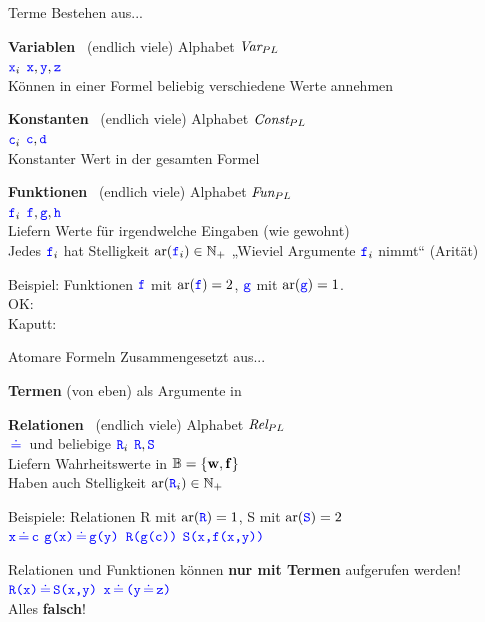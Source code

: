 \begin{frame}{Terme}
	Bestehen aus... \\
	\medskip
	
	\textbf{Variablen} \, (endlich viele) \quad Alphabet $\text{\itshape Var}_{PL}$ \\
	$\hbox{\textcolor{blue}{\texttt{x}}}_i$ \quad $\hbox{\textcolor{blue}{\texttt{x}}}, \hbox{\textcolor{blue}{\texttt{y}}}, \hbox{\textcolor{blue}{\texttt{z}}}$ \\
	Können in einer Formel beliebig verschiedene Werte annehmen \\
	\medskip \pause
	
	\textbf{Konstanten} \, (endlich viele) \quad Alphabet $\text{\itshape Const}_{PL}$ \\
	$\hbox{\textcolor{blue}{\texttt{c}}}_i$ \quad $\hbox{\textcolor{blue}{\texttt{c}}}, \hbox{\textcolor{blue}{\texttt{d}}}$ \\
	Konstanter Wert in der gesamten Formel \\
	\medskip \pause
	
	\textbf{Funktionen} \, (endlich viele) \quad Alphabet $\text{\itshape Fun}_{PL}$ \\
	$\hbox{\textcolor{blue}{\texttt{f}}}_i$ \quad $\hbox{\textcolor{blue}{\texttt{f}}}, \hbox{\textcolor{blue}{\texttt{g}}}, \hbox{\textcolor{blue}{\texttt{h}}}$ \\
	Liefern Werte für irgendwelche Eingaben (wie gewohnt) \\
	Jedes $\hbox{\textcolor{blue}{\texttt{f}}}_i$ hat Stelligkeit $\mathrm{ar}(\hbox{\textcolor{blue}{\texttt{f}}}_i) \in \mathbb{N}_+$ \quad „Wieviel Argumente $\hbox{\textcolor{blue}{\texttt{f}}}_i$ nimmt“ {\small (Arität)} \\
	\smallskip \pause
	
	Beispiel: 
	\quad Funktionen $\hbox{\textcolor{blue}{\texttt{f}}}$ mit $\mathrm{ar}(\hbox{\textcolor{blue}{\texttt{f}}}) = 2$, \quad $\hbox{\textcolor{blue}{\texttt{g}}}$ mit $\mathrm{ar}(\hbox{\textcolor{blue}{\texttt{g}}}) = 1$. \\ \pause
	\quad OK: \qquad {} \qquad {} \qquad {} \\
	\quad Kaputt: \qquad {} \qquad {} \qquad {} \qquad {}
\end{frame}

\begin{frame}{Atomare Formeln}
	Zusammengesetzt aus... \\
	\medskip
	
	\textbf{Termen} (von eben) als Argumente in \\
	\medskip
	
	\textbf{Relationen} \, (endlich viele) \quad Alphabet $\text{\itshape Rel}_{PL}$  \\
	$\pleq$ und beliebige $\hbox{\textcolor{blue}{\texttt{R}}}_i$ \quad $\hbox{\textcolor{blue}{\texttt{R}}}, \hbox{\textcolor{blue}{\texttt{S}}}$ \\
	Liefern Wahrheitswerte in $\mathbb{B} = \left\{\hbox{\textbf{w}}, \hbox{\textbf{f}}\right\}$ \\
	Haben auch Stelligkeit $\mathrm{ar}(\hbox{\textcolor{blue}{\texttt{R}}}_i) \in \mathbb{N}_+$ \\
	\medskip \pause
	
	Beispiele: \quad Relationen \word R mit $\mathrm{ar}(\hbox{\textcolor{blue}{\texttt{R}}}) = 1$, \quad \word S mit $\mathrm{ar}(\hbox{\textcolor{blue}{\texttt{S}}}) = 2$ \\
	\quad $\word x \pleq \word c$ \qquad $\word{g(x)} \pleq \word{g(y)}$ \qquad $\hbox{\textcolor{blue}{\texttt{R(g(c))}}}$ \qquad $\hbox{\textcolor{blue}{\texttt{S(x,f(x,y))}}}$
	\medskip \pause
	
	Relationen und Funktionen können \textbf{nur mit Termen} aufgerufen werden! \\
	\impl \quad {} \qquad {} \qquad $\word{R(x)} \pleq \word{S(x,y)}$ \qquad $\word x \pleq \word{(}\word y \pleq \word z\word{)}$ \\
	Alles \textbf{falsch}!
\end{frame}

